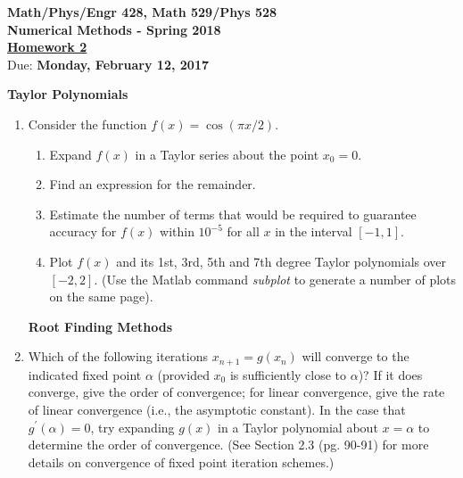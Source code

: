 \documentclass [12pt]{article}
\begin{document}
\def\e{\mathop{\rm e}\nolimits}
\noindent
\begin{center}
{ \bf  {Math/Phys/Engr 428, Math 529/Phys 528 \\
Numerical Methods - Spring 2018 }}\\[7pt]
\underline{\bf Homework 2}\\

Due: {\bf Monday, February 12, 2017}

\end{center}


{\bf Taylor Polynomials}

\begin{enumerate}

\item Consider the function $f(x)=\cos(\pi x/2)$.

\begin{enumerate}

\item Expand $f(x)$ in a Taylor series about the point $x_0=0$.

\item Find an expression for the remainder.

\item Estimate the number of terms that would be required to guarantee
accuracy for $f(x)$ within $10^{-5}$  for all $x$ in the interval
$[-1, 1]$.

\item Plot $f(x)$ and its 1st, 3rd, 5th and 7th degree Taylor polynomials
over $[-2, 2]$. (Use the Matlab command {\em subplot}
to generate a number of plots on the same page).

\end{enumerate}


{\bf Root Finding Methods}



\item Which of the following iterations $x_{n+1}=g(x_{n})$ will
converge to the indicated fixed point $\alpha$ (provided $x_0$ is
sufficiently close to $\alpha$)? If it does converge, give the
order of convergence; for linear convergence, give the rate of
linear convergence (i.e., the asymptotic constant).  In the case
that $g^{\prime}(\alpha)=0$, try expanding $g(x)$ in a Taylor
polynomial about $x=\alpha$ to determine the order of convergence. (See Section 2.3 (pg. 90-91) for more details on convergence of fixed point iteration schemes.)


\end{enumerate}
\end{document}
